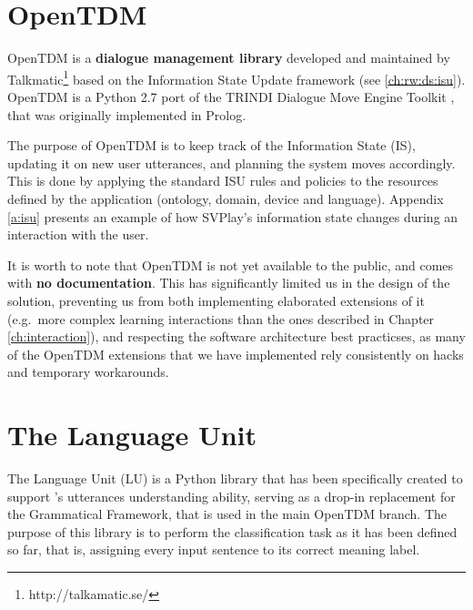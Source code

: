 \section{OpenTDM} \label{ch:arch:TDM}
OpenTDM is a \textbf{dialogue management library} developed and maintained by Talkmatic\footnote{http://talkamatic.se/} based on the Information State Update framework (see \ref{ch:rw:ds:isu}). OpenTDM is a Python 2.7 port of the TRINDI Dialogue Move Engine Toolkit \citep{Larsson:2000:ISD:973935.973943}, that was originally implemented in Prolog.

The purpose of OpenTDM is to keep track of the Information State (IS), updating it on new user utterances, and planning the system moves accordingly. This is done by applying the standard ISU rules and policies \citep{Larsson02issue-baseddialogue} to the resources defined by the application (ontology, domain, device and language). Appendix \ref{a:isu} presents an example of how SVPlay's information state changes during an interaction with the user.

It is worth to note that OpenTDM is not yet available to the public, and comes with \textbf{no documentation}. This has significantly limited us in the design of the solution, preventing us from both implementing elaborated extensions of it (e.g.\ more complex learning interactions than the ones described in Chapter \ref{ch:interaction}), and respecting the software architecture best practicses, as many of the OpenTDM extensions that we have implemented rely consistently on hacks and temporary workarounds.

\section{The Language Unit} \label{ch:arch:LU}
The Language Unit (LU) is a Python library that has been specifically created to support \pname's utterances understanding ability, serving as a drop-in replacement for the Grammatical Framework, that is used in the main OpenTDM branch. The purpose of this library is to perform the classification task as it has been defined so far, that is, assigning every input sentence to its correct meaning label.

